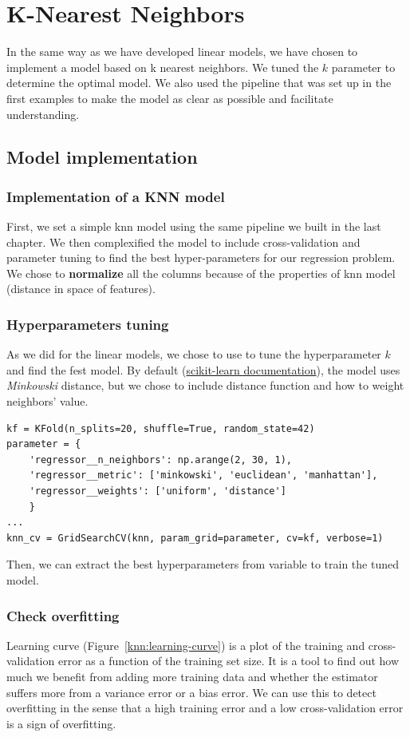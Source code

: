 \section{K-Nearest Neighbors}
In the same way as we have developed linear models, we have chosen to implement a model based on k nearest neighbors. We tuned the $k$ parameter to determine the optimal model. We also used the pipeline that was set up in the first examples to make the model as clear as possible and facilitate understanding.

\subsection{Model implementation}
\subsubsection{Implementation of a KNN model}
First, we set a simple knn model using the same pipeline we built in the last chapter. We then complexified the model to include cross-validation and parameter tuning to find the best hyper-parameters for our regression problem. We chose to \textbf{normalize} all the columns because of the properties of knn model (distance in space of features).

\subsubsection{Hyperparameters tuning}
As we did for the linear models, we chose to use  to tune the hyperparameter $k$ and find the fest model. By default (\href{https://scikit-learn.org/stable/modules/generated/sklearn.neighbors.KNeighborsClassifier.html}{scikit-learn documentation}), the model uses \textit{Minkowski} distance, but we chose to include distance function and how to weight neighbors' value.
\begin{lstlisting}
kf = KFold(n_splits=20, shuffle=True, random_state=42)
parameter = {
    'regressor__n_neighbors': np.arange(2, 30, 1),
    'regressor__metric': ['minkowski', 'euclidean', 'manhattan'],
    'regressor__weights': ['uniform', 'distance']
    }
...
knn_cv = GridSearchCV(knn, param_grid=parameter, cv=kf, verbose=1)
\end{lstlisting}
Then, we can extract the best hyperparameters from  variable to train the tuned model.
\subsubsection{Check overfitting}
Learning curve (Figure~\ref{knn:learning-curve}) is a plot of the training and cross-validation error as a function of the training set size. It is a tool to find out how much we benefit from adding more training data and whether the estimator suffers more from a variance error or a bias error. We can use this to detect overfitting in the sense that a high training error and a low cross-validation error is a sign of overfitting.

